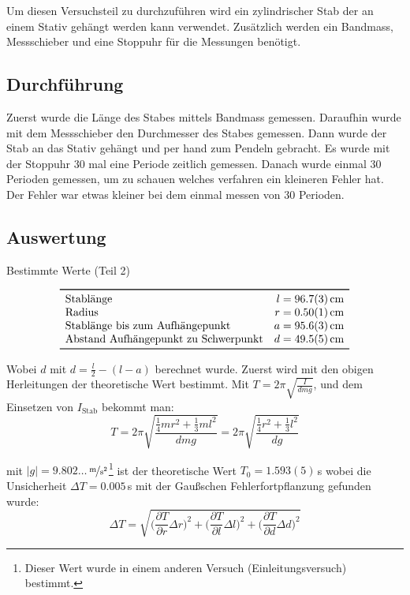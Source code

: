 \documentclass[11pt,a4paper]{article}
\newcommand{\pard}[2]{\frac{\partial #1}{\partial #2}}
\newcommand{\bigp}[1]{\bigg(#1\bigg)}
\begin{document}
Um diesen Versuchsteil zu durchzuführen wird ein zylindrischer Stab der an einem Stativ gehängt werden kann verwendet. Zusätzlich werden ein Bandmass, Messschieber und eine Stoppuhr für die Messungen benötigt. 



\FloatBarrier
\subsection{Durchführung}

Zuerst wurde die Länge des Stabes mittels Bandmass gemessen. Daraufhin wurde mit dem Messschieber den Durchmesser des Stabes gemessen. Dann wurde der Stab an das Stativ gehängt und per hand zum Pendeln gebracht. Es wurde mit der Stoppuhr 30 mal eine Periode zeitlich gemessen. Danach wurde einmal 30 Perioden gemessen, um zu schauen welches verfahren ein kleineren Fehler hat. Der Fehler war etwas kleiner bei dem einmal messen von 30 Perioden.

\subsection{Auswertung}

\begin{table}[ht]
\caption{Bestimmte Werte (Teil 2)}
$$
\begin{array}{lr}
	\toprule 
	\textrm{Stablänge} & l = 96.7(3)\,\textrm{cm} \\
	\textrm{Radius} & r = 0.50(1)\,\textrm{cm} \\
	\textrm{Stablänge bis zum Aufhängepunkt} & a = 95.6(3)\,\textrm{cm}\\
	\textrm{Abstand Aufhängepunkt zu Schwerpunkt} & d = 49.5(5)\,\textrm{cm}\\
	\bottomrule 
\end{array}
$$
\end{table}
Wobei $d$ mit $d = \frac{l}{2} - (l - a)$ berechnet wurde.
Zuerst wird mit den obigen Herleitungen der theoretische Wert bestimmt. Mit $T = 2\pi \sqrt{\frac{I}{dmg}}$, und dem Einsetzen von $I_{\textrm{Stab}}$ bekommt man:
$$T = 2\pi \sqrt{\frac{\frac{1}{4} m r^2 + \frac{1}{3} m l^2}{dmg}} = 2\pi \sqrt{\frac{\frac{1}{4} r^2 + \frac{1}{3} l^2}{dg}}$$

mit $|g|=9.802\dots$\,$\nicefrac{\textrm{m}}{\textrm{s}^2}$\footnote{Dieser Wert wurde in einem anderen Versuch (Einleitungsversuch) bestimmt.} ist der theoretische Wert $T_0 = 1.593(5)$\,s wobei die Unsicherheit $\Delta T = 0.005$\,s mit der Gaußschen Fehlerfortpflanzung gefunden wurde:
$$\Delta T = \sqrt{ \bigp{\pard{T}{r}\Delta r}^2 + \bigp{\pard{T}{l}\Delta l}^2 + \bigp{\pard{T}{d}\Delta d}^2 }$$
\end{document}
